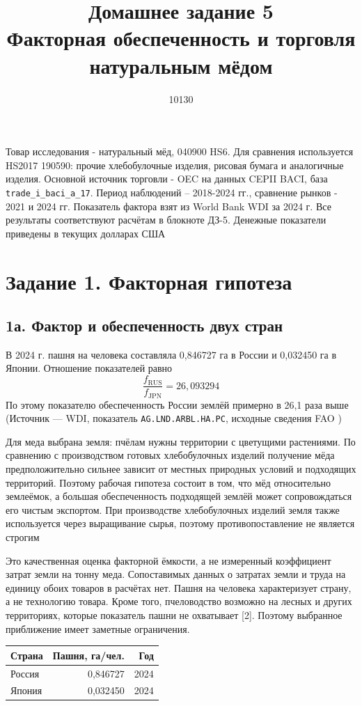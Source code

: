 \documentclass[11pt,a4paper]{article}
\title{Домашнее задание 5\\Факторная обеспеченность и торговля\\натуральным мёдом}
\author{10130}
\begin{document}
\maketitle
\noindent Товар исследования - натуральный мёд,  040900 HS6. Для сравнения используется HS2017 190590: прочие хлебобулочные изделия, рисовая бумага и аналогичные изделия. Основной источник торговли - OEC на данных CEPII BACI, база \texttt{trade\_i\_baci\_a\_17}. Период наблюдений -- 2018-2024 гг., сравнение рынков - 2021 и 2024 гг. Показатель фактора взят из World Bank WDI за 2024 г. Все результаты соответствуют расчётам в блокноте ДЗ-5. Денежные показатели приведены в текущих долларах США

\section*{Задание 1. Факторная гипотеза}

\subsection*{1а. Фактор и обеспеченность двух стран}
В 2024 г. пашня на человека составляла 0,846727 га в России и 0,032450 га в Японии. Отношение показателей равно
\[
\frac{f_{\mathrm{RUS}}}{f_{\mathrm{JPN}}}=26{,}093294
\]
По этому показателю обеспеченность России землёй примерно в 26,1 раза выше (Источник --- WDI, показатель \texttt{AG.LND.ARBL.HA.PC}, исходные сведения FAO )

Для меда выбрана земля: пчёлам нужны территории с цветущими растениями. По сравнению с производством готовых хлебобулочных изделий получение мёда предположительно сильнее зависит от местных природных условий и подходящих территорий. Поэтому рабочая гипотеза состоит в том, что мёд относительно землеёмок, а большая обеспеченность подходящей землёй может сопровождаться его чистым экспортом. При производстве хлебобулочных изделий земля также используется через выращивание сырья, поэтому противопоставление не является строгим

Это качественная оценка факторной ёмкости, а не измеренный коэффициент затрат земли на тонну меда. Сопоставимых данных о затратах земли и труда на единицу обоих товаров в расчётах нет. Пашня на человека характеризует страну, а не технологию товара. Кроме того, пчеловодство возможно на лесных и других территориях, которые показатель пашни не охватывает [2]. Поэтому выбранное приближение имеет заметные ограничения.

\begin{center}
\begin{tabular}{lrr}
\toprule
Страна & Пашня, га/чел. & Год\\
\midrule
Россия & 0,846727 & 2024\\
Япония & 0,032450 & 2024\\
\bottomrule
\end{tabular}
\end{center}
\end{document}
